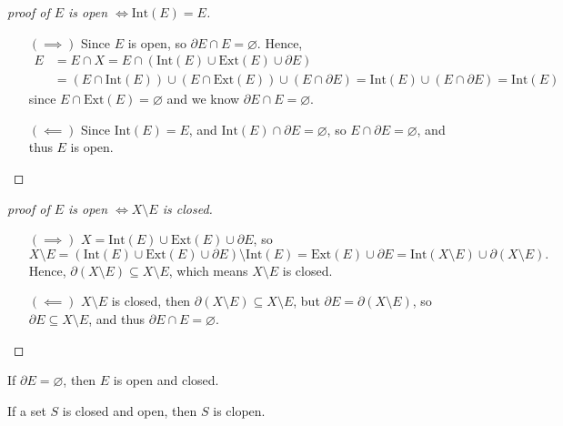 \begin{proof}[proof of \(E\) is open \(\iff \mathrm{Int}(E) = E\)]
    \vphantom{text}
    \begin{itemize}
        \item [\((\implies )\)] Since \(E\) is open, so \(\partial E \cap E = \varnothing \). Hence, 
        \begin{align*}
            E &= E \cap X = E \cap (\mathrm{Int}(E) \cup \mathrm{Ext}(E) \cup \partial E) \\
            &= (E \cap \mathrm{Int}(E) ) \cup (E \cap \mathrm{Ext}(E)) \cup (E \cap \partial E) = \mathrm{Int}(E) \cup (E \cap \partial E) = \mathrm{Int}(E)
        \end{align*}
        since \(E \cap \mathrm{Ext}(E) =\varnothing  \) and we know \(\partial E \cap E = \varnothing \).  
        \item [\((\impliedby )\)] Since \(\mathrm{Int}(E) = E \), and \(\mathrm{Int}(E) \cap \partial E = \varnothing \), so \(E \cap \partial E = \varnothing \), and thus \(E\) is open.    
    \end{itemize}
\end{proof}
\begin{proof}[proof of \(E\) is open \(\iff X\setminus E\) is closed]
    \vphantom{text}
    \begin{itemize}
        \item [\((\implies )\)]
            \(X = \mathrm{Int}(E) \cup \mathrm{Ext}(E) \cup \partial E\), so
            \[
                X \setminus E = (\mathrm{Int}(E) \cup \mathrm{Ext}(E) \cup \partial E ) \setminus \mathrm{Int}(E) = \mathrm{Ext}(E) \cup \partial E = \mathrm{Int}(X\setminus E) \cup \partial (X \setminus E). 
            \] 
            Hence, \(\partial (X \setminus E) \subseteq X\setminus E\), which means \(X \setminus E\) is closed. 
        \item [\((\impliedby )\)] \(X \setminus E\) is closed, then \(\partial (X \setminus E) \subseteq X \setminus E\), but \(\partial E = \partial (X \setminus E)\), so \(\partial E \subseteq X \setminus E\), and thus \(\partial E \cap E = \varnothing \).     
    \end{itemize}
\end{proof}

\begin{remark}
    If \(\partial E = \varnothing \), then \(E\) is open and closed.   
\end{remark}

\begin{definition}[Clopen] \label{def: clopen}
    If a set \(S\) is closed and open, then \(S\) is clopen.  
\end{definition}

